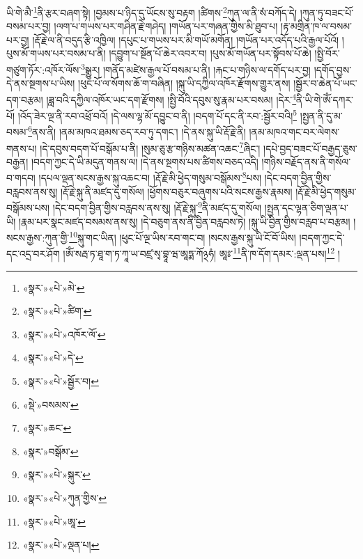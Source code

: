 ཡི་གེ་མཻ་\footnote{«སྣར་»«པེ་»མེ་}ནི་རྩར་བཞག་སྟེ། །བྱམས་པ་ཉིད་དུ་ཡོངས་སུ་བརྟག །ཚིགས་\footnote{«སྣར་»«པེ་»ཚིག་}ཀུན་ལ་ནི་སཾ་བཀོད་དེ། །ཀུན་ཏུ་བཟང་པོ་བསམ་པར་བྱ། །ལག་པ་གཡས་པར་གཤིན་རྗེ་གཤེད། །གཡོན་པར་གཞན་གྱིས་མི་ཐུབ་པ། །རྟ་མགྲིན་ཁ་ལ་བསམ་པར་བྱ། །རྡོ་རྗེ་ལ་ནི་བདུད་རྩི་འཁྱིལ། །དཔུང་པ་གཡས་པར་མི་གཡོ་མགོན། །གཡོན་པར་འདོད་པའི་རྒྱལ་པོའོ། །པུས་མོ་གཡས་པར་བསམ་པ་ནི། །དབྱུག་པ་སྔོན་པོ་ཆེར་འབར་བ། །པུས་མོ་གཡོན་པར་སྟོབས་པོ་ཆེ། །སྤྱི་བོར་གཙུག་ཏོར་:འཁོར་ལོས་\footnote{«སྣར་»«པེ་»འཁོར་ལོ་}སྒྱུར། །གནོད་མཛེས་རྒྱལ་པོ་བསམ་པ་ནི། །རྐང་པ་གཉིས་ལ་དགོད་པར་བྱ། །དགོད་བྱས་དེ་ནས་སྔགས་པ་ཡིས། །ཕུང་པོ་ལ་སོགས་ཆོ་ག་བཞིན། །སྐུ་ཡི་དཀྱིལ་འཁོར་རྫོགས་གྱུར་ནས། །སྦྱོར་བ་ཆེན་པོ་ཡང་དག་བརྩམ། །ཟླ་བའི་དཀྱིལ་འཁོར་ཡང་དག་རྫོགས། །སྤྱི་བོའི་དབུས་སུ་རྣམ་པར་བསམ། །དེར་\footnote{«སྣར་»«པེ་»དེ་}ནི་ཡི་གེ་ཨོཾ་དཀར་པོ། །འོད་ཟེར་ལྔ་ནི་རབ་འཕྲོ་བའོ། །དེ་ལས་ལྷ་མོ་དབྱུང་བ་ནི། །བདག་པོ་དང་ནི་རབ་:སྦྱོར་བའི།\footnote{«སྣར་»«པེ་»སྦྱོར་བ།} །སྤྱན་ནི་དུ་མ་བསམ་\footnote{«སྡེ་»བསམས་}ནས་ནི། །ནམ་མཁའ་ཐམས་ཅད་རབ་ཏུ་དགང་། །དེ་ནས་སྐུ་ཡི་རྡོ་རྗེ་ནི། །ནམ་མཁའ་གང་བར་ལེགས་གནས་པ། །དེ་དབུས་བདག་པོ་བསྒོམ་པ་ནི། །སུམ་ཅུ་རྩ་གཉིས་མཚན་འཆང་\footnote{«སྣར་»ཆང་}ཞིང་། །དཔེ་བྱད་བཟང་པོ་བརྒྱད་ཅུས་བརྒྱན། །བདག་ཀྱང་དེ་ཡི་མདུན་གནས་ལ། །དེ་ནས་སྔགས་པས་ཚིགས་བཅད་འདི། །གཉིས་བརྗོད་ནས་ནི་གསོལ་བ་གདབ། །དཔལ་ལྡན་སངས་རྒྱས་སྐུ་འཆང་བ། །རྡོ་རྗེ་མི་ཕྱེད་གསུམ་བསྒོམས་\footnote{«སྣར་»བསྒོམ་}པས། །དེང་བདག་བྱིན་གྱིས་བརླབས་ནས་སུ། །རྡོ་རྗེ་སྐུ་ནི་མཛད་དུ་གསོལ། །ཕྱོགས་བཅུར་བཞུགས་པའི་སངས་རྒྱས་རྣམས། །རྡོ་རྗེ་མི་ཕྱེད་གསུམ་བསྒོམས་པས། །དེང་བདག་བྱིན་གྱིས་བརླབས་ནས་སུ། །རྡོ་རྗེ་སྐུ་\footnote{«སྣར་»«པེ་»སྐུར་}ནི་མཛད་དུ་གསོལ། །སྤྱན་དང་ལྷན་ཅིག་ལྡན་པ་ཡི། །རྣམ་པར་སྣང་མཛད་བསམས་ནས་སུ། །དེ་བཅུག་ནས་ནི་བྱིན་བརླབས་ཏེ། །སྐུ་ཡི་བྱིན་གྱིས་བརླབ་པ་བརྩམ། །སངས་རྒྱས་:ཀུན་གྱི་\footnote{«སྣར་»«པེ་»ཀུན་གྱིས་}སྐུ་གང་ཡིན། །ཕུང་པོ་ལྔ་ཡིས་རབ་གང་བ། །སངས་རྒྱས་སྐུ་ཡི་ངོ་བོ་ཡིས། །བདག་ཀྱང་དེ་དང་འདྲ་བར་ཤོག །ཨོཾ་སརྦ་ཏ་ཐཱ་ག་ཏ་ཀཱ་ཡ་བཛྲ་སྭ་བྷཱ་ཝ་ཨཱཏྨ་ཀོ྅ཧཾ། ཨཱཿ་\footnote{«སྣར་»«པེ་»ཨཱ་}ནི་ཁ་དོག་དམར་:ལྡན་པས།\footnote{«སྣར་»«པེ་»ལྡན་པ།} །
